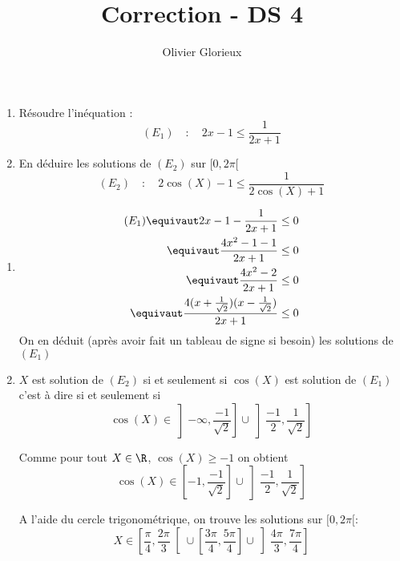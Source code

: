 \documentclass[a4paper, 11pt,reqno]{article}
\author{Olivier Glorieux}
\begin{document}
\title{Correction - DS 4}




\begin{exercice}
\begin{enumerate}
\item Résoudre l'inéquation :  $$ (E_1)   \quad : \quad 2x-1\leq \frac{1}{2x+1}$$
\item En déduire les solutions de $(E_2)$ sur $[0, 2\pi[$
$$(E_2)   \quad : \quad   2\cos(X)-1\leq \frac{1}{2\cos(X)+1}$$

\end{enumerate}

\end{exercice}
\begin{correction}
\begin{enumerate}
\item \begin{align*}
(E_1)\equivaut 2x-1 -\frac{1}{2x+1}\leq 0\\
		\equivaut  \frac{4x^2-1-1}{2x+1}\leq 0\\
		\equivaut  \frac{4x^2-2}{2x+1}\leq 0\\
		\equivaut  \frac{4(x+\frac{1}{\sqrt{2}})(x-\frac{1}{\sqrt{2}}) }{2x+1}\leq 0\\
\end{align*}
On en déduit (après avoir fait un tableau de signe si besoin) les solutions de $(E_1) $
\conclusion{ $S_1 = \left] -\infty, \frac{-1}{\sqrt{2}}\right]\cup \left]\frac{-1}{2} , \frac{1}{\sqrt{2}}\right]$}
\item $X$ est solution de $(E_2)$ si et seulement si $\cos(X) $ est solution de $(E_1)$ c'est à dire si et seulement si 
$$\cos(X) \in  
\left] -\infty, \frac{-1}{\sqrt{2}}\right]\cup \left]\frac{-1}{2} , \frac{1}{\sqrt{2}}\right]$$

Comme pour tout $X\in \R$, $\cos(X)\geq-1$ on obtient 
$$\cos(X) \in  
\left[ -1 ,\frac{-1}{\sqrt{2}}\right]\cup \left]\frac{-1}{2} , \frac{1}{\sqrt{2}}\right]$$

A l'aide du cercle trigonométrique, on trouve les solutions sur $[0,2\pi[:$
$$X\in \left[\frac{\pi}{4}, \frac{2\pi}{3}  \right[ \cup   \left[\frac{3\pi}{4}, \frac{5\pi}{4}\right]  \cup   \left] \frac{4\pi}{3}, \frac{7\pi}{4}\right]$$


\end{enumerate}

\end{correction}
\vspace{0.6cm}
\end{document}
